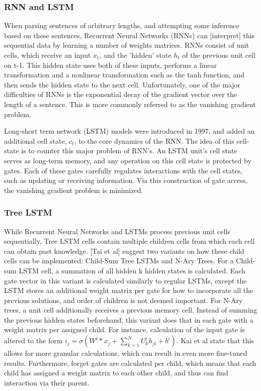 \subsubsection{RNN and LSTM}
When parsing sentences of arbitrary lengths, and attempting some inference based
on these sentences, Recurrent Neural Networks (RNNs) can [interpret] this
sequential data by learning a number of weights matrices. RNNs consist of unit
cells, which receive an input $x_t$, and the 'hidden' state $h_t$ of the
previous unit cell on t-1. This hidden state uses both of these inputs, performs
a linear transformation and a nonlinear transformation such as the tanh
function, and then sends the hidden state to the next cell. Unfortunately, one of
the major difficulties of RNNs is the exponential decay of the gradient vector
over the length of a sentence\cite{bengio1994learning}. This is more commonly
referred to as the vanishing gradient problem.

Long-short term network (LSTM) models \cite{hochreiter1997long} were introduced
in 1997, and added an additional cell state, $c_t$, to the core dynamics of the
RNN. The idea of this cell-state is to counter this major problem of RNN's. An
LSTM unit's cell state serves as long-term memory, and any operation on this
cell state is protected by gates. Each of these gates carefully regulates
interactions with the cell states, such as updating or receiving information.
Via this construction of gate access, the vanishing gradient problem is
minimized.
\subsubsection{Tree LSTM}
While Recurrent Neural Networks and LSTMs process previous unit cells
sequentially, Tree LSTM cells \cite{DBLP:journals/corr/TaiSM15}
\cite{DBLP:journals/corr/ZhuSG15} \cite{DBLP:journals/corr/LeZ15} contain
multiple children cells from which each cell can obtain past knowledge. [Tai et
al] suggest two variants on how these child cells can be implemented: Child-Sum
Tree LSTMs and N-Ary Trees. For a Child-sum LSTM cell, a summation of all hidden
k hidden states is calculated. Each gate vector in this variant is calculated
similarly to regular LSTMs, except the LSTM stores an additional weight matrix
per gate for how to incorporate all the previous solutions, and order of
children is not deemed important. For N-Ary trees, a unit cell additionally
receives a previous memory cell. Instead of summing the previous hidden states
beforehand, this variant does that in each gate with a weight matrix per
assigned child. For instance, calculation of the input gate is altered to the
form $i_j=\sigma(W^i*x_j + \sum\limits_{k=1}^{N}U_k^{i}h_{jl}+b^i)$. Kai et al
state that this allows for more granular calculations, which can result in even
more fine-tuned results. Furthermore, forget gates are calculated per child,
which means that each child has assigned a weight matrix to each other child,
and thus can find interaction via their parent. 